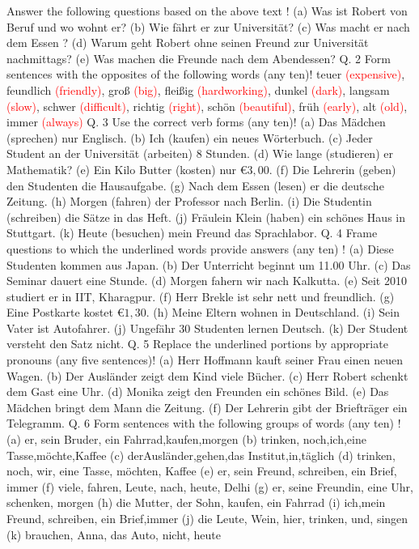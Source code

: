 \documentclass{article}
\begin{document}
Answer the following questions based on the above text !
(a) Was ist Robert von Beruf und wo wohnt er?
(b) Wie fährt er zur Universität?
(c) Was macht er nach dem Essen ?
(d) Warum geht Robert ohne seinen Freund zur Universität nachmittags?
(e) Was machen die Freunde nach dem Abendessen?
Q. 2 Form sentences with the opposites of the following words (any ten)!
teuer \textcolor{red}{(expensive)}, feundlich \textcolor{red}{(friendly)}, groß \textcolor{red}{(big)}, fleißig \textcolor{red}{(hardworking)}, dunkel \textcolor{red}{(dark)}, langsam \textcolor{red}{(slow)}, schwer \textcolor{red}{(difficult)}, richtig \textcolor{red}{(right)}, schön \textcolor{red}{(beautiful)}, früh \textcolor{red}{(early)}, alt \textcolor{red}{(old)}, immer \textcolor{red}{(always)}
Q. 3 Use the correct verb forms (any ten)!
(a) Das Mädchen (sprechen) nur Englisch.
(b) Ich (kaufen) ein neues Wörterbuch.
(c) Jeder Student an der Universität (arbeiten) 8 Stunden.
(d) Wie lange (studieren) er Mathematik?
(e) Ein Kilo Butter (kosten) nur \(€ 3,00\).
(f) Die Lehrerin (geben) den Studenten die Hausaufgabe.
(g) Nach dem Essen (lesen) er die deutsche Zeitung.
(h) Morgen (fahren) der Professor nach Berlin.
(i) Die Studentin (schreiben) die Sätze in das Heft.
(j) Fräulein Klein (haben) ein schönes Haus in Stuttgart.
(k) Heute (besuchen) mein Freund das Sprachlabor.
Q. 4 Frame questions to which the underlined words provide answers (any ten) !
(a) Diese Studenten kommen aus Japan.
(b) Der Unterricht beginnt um 11.00 Uhr.
(c) Das Seminar dauert eine Stunde.
(d) Morgen fahern wir nach Kalkutta.
(e) Seit 2010 studiert er in IIT, Kharagpur.
(f) Herr Brekle ist sehr nett und freundlich.
(g) Eine Postkarte kostet \(€ 1,30\).
(h) Meine Eltern wohnen in Deutschland.
(i) Sein Vater ist Autofahrer.
(j) Ungefähr 30 Studenten lernen Deutsch.
(k) Der Student versteht den Satz nicht.
Q. 5 Replace the underlined portions by appropriate pronouns (any five sentences)!
(a) Herr Hoffmann kauft seiner Frau einen neuen Wagen.
(b) Der Ausländer zeigt dem Kind viele Bücher.
(c) Herr Robert schenkt dem Gast eine Uhr.
(d) Monika zeigt den Freunden ein schönes Bild.
(e) Das Mädchen bringt dem Mann die Zeitung.
(f) Der Lehrerin gibt der Briefträger ein Telegramm.
Q. 6 Form sentences with the following groups of words (any ten) !
(a) er, sein Bruder, ein Fahrrad,kaufen,morgen
(b) trinken, noch,ich,eine Tasse,möchte,Kaffee
(c) derAusländer,gehen,das Institut,in,täglich
(d) trinken, noch, wir, eine Tasse, möchten, Kaffee
(e) er, sein Freund, schreiben, ein Brief, immer
(f) viele, fahren, Leute, nach, heute, Delhi
(g) er, seine Freundin, eine Uhr, schenken, morgen
(h) die Mutter, der Sohn, kaufen, ein Fahrrad
(i) ich,mein Freund, schreiben, ein Brief,immer
(j) die Leute, Wein, hier, trinken, und, singen
(k) brauchen, Anna, das Auto, nicht, heute
\end{document}
